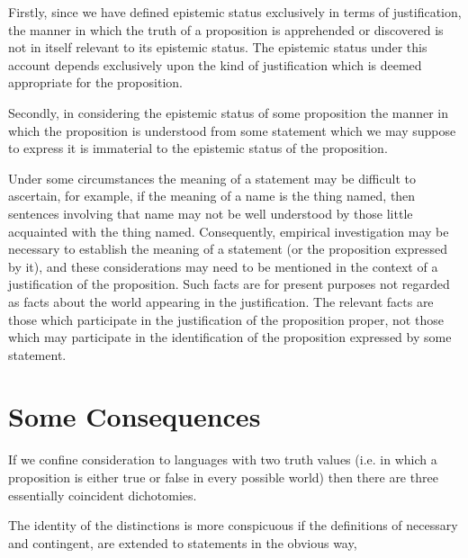 Firstly, since we have defined epistemic status exclusively in terms of justification, the manner in which the truth of a proposition is apprehended or discovered is not in itself relevant to its epistemic status.
The epistemic status under this account depends exclusively upon the kind of justification which is deemed appropriate for the proposition.

Secondly, in considering the epistemic status of some proposition the manner in which the proposition is understood from some statement which we may suppose to express it is immaterial to the epistemic status of the proposition.

Under some circumstances the meaning of a statement may be difficult to ascertain, for example, if the meaning of a name is the thing named, then sentences involving that name may not be well understood by those little acquainted with the thing named.
Consequently, empirical investigation may be necessary to establish the meaning of a statement (or the proposition expressed by it), and these considerations may need to be mentioned in the context of a justification of the proposition.
Such facts are for present purposes not regarded as facts about the world appearing in the justification.
The relevant facts are those which participate in the justification of the proposition proper, not those which may participate in the identification of the proposition expressed by some statement.

\section{Some Consequences}

If we confine consideration to languages with two truth values (i.e.
in which a proposition is either true or false in every possible world)
then there are three essentially coincident dichotomies.

The identity of the distinctions is more conspicuous if the definitions
of necessary and contingent, are extended to statements in the obvious
way,


